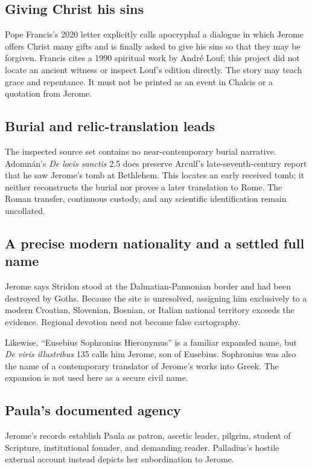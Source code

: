 \subsection{Giving Christ his sins}

Pope Francis's 2020 letter explicitly calls apocryphal a dialogue in which
Jerome offers Christ many gifts and is finally asked to give his sins so that
they may be forgiven. Francis cites a 1990 spiritual work by Andr\'e Louf; this
project did not locate an ancient witness or inspect Louf's edition directly.
The story may teach grace and repentance. It must not be printed as an event in
Chalcis or a quotation from Jerome.

\subsection{Burial and relic-translation leads}

The inspected source set contains no near-contemporary burial narrative.
Adomn\'an's \emph{De locis sanctis} 2.5 does preserve Arculf's
late-seventh-century report that he saw Jerome's tomb at Bethlehem. This
locates an early received tomb; it neither reconstructs the burial nor proves a
later translation to Rome. The Roman transfer, continuous custody, and any
scientific identification remain uncollated.

\subsection{A precise modern nationality and a settled full name}

Jerome says Stridon stood at the Dalmatian-Pannonian border and had been
destroyed by Goths. Because the site is unresolved, assigning him exclusively
to a modern Croatian, Slovenian, Bosnian, or Italian national territory exceeds
the evidence. Regional devotion need not become false cartography.

Likewise, ``Eusebius Sophronius Hieronymus'' is a familiar expanded name, but
\emph{De viris illustribus} 135 calls him Jerome, son of Eusebius. Sophronius
was also the name of a contemporary translator of Jerome's works into Greek.
The expansion is not used here as a secure civil name.

\subsection{Paula's documented agency}

Jerome's records establish Paula as patron, ascetic leader, pilgrim, student of
Scripture, institutional founder, and demanding reader. Palladius's hostile
external account instead depicts her subordination to Jerome.

